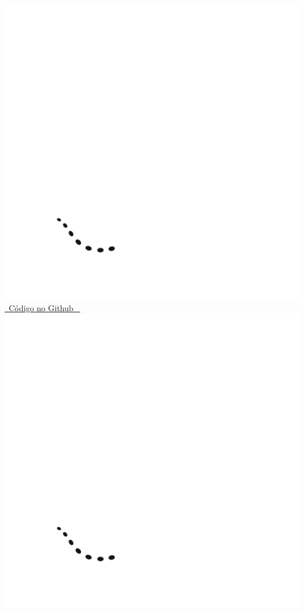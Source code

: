 \documentclass[a4paper,11pt,oneside]{book}
\theoremstyle{definition}
\theoremstyle{break}
\begin{document}
\begin{center}
\href{https://github.com/brunoruas2/Meus_Estudos/blob/main/Microeconomia/Microeconomics\%20-\%20Hal\%20Varian/models/cap25.2-demanda_linear_e_monopolio.py}{\includegraphics[scale=0.03]{_github_logo.png} \ Código no Github \ \includegraphics[scale=0.03]{_github_logo.png}}
\end{center}
\end{document}
